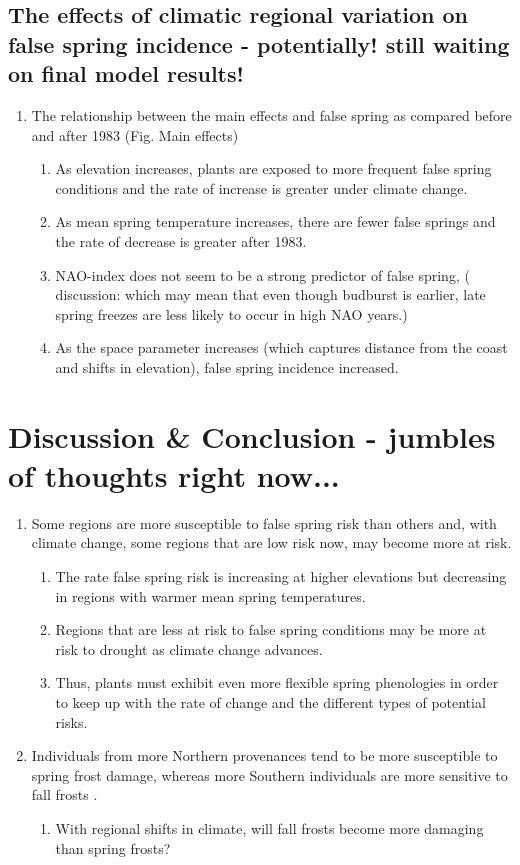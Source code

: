 \documentclass{article}\usepackage[]{graphicx}\usepackage[]{color}
\begin{document}
\subsection*{The effects of climatic regional variation on false spring incidence - potentially! still waiting on final model results!}
\begin{enumerate}
\item The relationship between the main effects and false spring as compared before and after 1983 (Fig. Main effects)
\begin{enumerate}
\item As elevation increases, plants are exposed to more frequent false spring conditions and the rate of increase is greater under climate change.
\item As mean spring temperature increases, there are fewer false springs and the rate of decrease is greater after 1983.
\item NAO-index does not seem to be a strong predictor of false spring, ( discussion: which may mean that even though budburst is earlier, late spring freezes are less likely to occur in high NAO years.)
\item As the space parameter increases (which captures distance from the coast and shifts in elevation), false spring incidence increased. 
\end{enumerate}
\end{enumerate}

\section*{Discussion \& Conclusion - jumbles of thoughts right now...}
\begin{enumerate}
\item Some regions are more susceptible to false spring risk than others and, with climate change, some regions that are low risk now, may become more at risk.
\begin{enumerate}
\item The rate false spring risk is increasing at higher elevations but decreasing in regions with warmer mean spring temperatures. 
\item Regions that are less at risk to false spring conditions may be more at risk to drought as climate change advances. 
\item Thus, plants must exhibit even more flexible spring phenologies in order to keep up with the rate of change and the different types of potential risks. 
\end{enumerate}
\item Individuals from more Northern provenances tend to be more susceptible to spring frost damage, whereas more Southern individuals are more sensitive to fall frosts \citep{Montwe2018}.
\begin{enumerate}
\item With regional shifts in climate, will fall frosts become more damaging than spring frosts?
\end{enumerate}
\end{enumerate}
\end{document}
